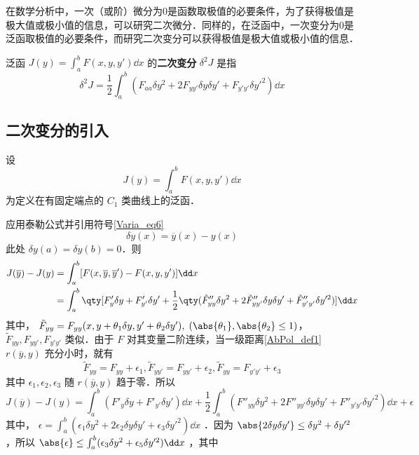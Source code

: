 
\begin{issues}
\issueTODO
\end{issues}

在数学分析中，一次（或阶）微分为0是函数取极值的必要条件，为了获得极值是极大值或极小值的信息，可以研究二次微分．同样的，在泛函中，一次变分为0是泛函取极值的必要条件，而研究二次变分可以获得极值是极大值或极小值的信息．

泛函 $J(y)=\int_a^bF(x,y,y')\dd x$ 的\textbf{二次变分} $\delta^2J$ 是指
\begin{equation}
\delta^2J=\frac{1}{2}\int_a^b(F_{aa}\delta y^2+2F_{yy'}\delta y\delta y'+F_{y'y'}\delta y'^2)\dd x
\end{equation}
\subsection{二次变分的引入}
设 
\begin{equation}
J(y)=\int_a^bF(x,y,y')\dd x
\end{equation}
为定义在有固定端点的 $C_1$ 类曲线上的泛函．

应用泰勒公式并引用符号\autoref{Varia_eq6}~
\begin{equation}
\delta y(x)=\overline{y}(x)-y(x)
\end{equation}
此处 $\delta y(a)=\delta y(b)=0$．则
\begin{equation}
\begin{aligned}
J(\overline{y})-J(y)&=\int_a^b[F(x,\overline{y},\overline{y}')-F(x,y,y')]\dd x\\
&=\int_a^b\qty[F'_y\delta y+F'_{y'}\delta y'+\frac{1}{2}\qty(\tilde{F}''_{yy}\delta y^2+2\tilde{F}''_{yy'}\delta y\delta y'+\tilde{F}''_{y'y'}\delta y'^2)]\dd x
\end{aligned}
\end{equation}
其中， $\tilde{F}_{yy}=F_{yy}(x,y+\theta_1\delta y,y'+\theta_2\delta y'),\;(\abs{\theta_1},\abs{\theta_2}\leq1)$，$\tilde{F}_{yy},F_{yy'},F_{y'y'}$ 类似．由于 $F$ 对其变量二阶连续，当一级距离\autoref{AbPol_def1}~ $r(\overline{y},y)$ 充分小时，就有
\begin{equation}
\tilde F_{yy}=F_{yy}+\epsilon_1,\tilde F_{yy'}=F_{yy'}+\epsilon_2,\tilde F_{yy}=F_{y'y'}+\epsilon_3
\end{equation}
其中 $\epsilon_1,\epsilon_2,\epsilon_3$ 随 $r(\overline{y},y)$ 趋于零．所以
\begin{equation}
J(\overline{y})-J(y)=\int_a^b(F'_y\delta y+F'_{y'}\delta y')\dd x+\frac{1}{2}\int_a^b(F''_{yy}\delta y^2+2F''_{yy'}\delta y\delta y'+F''_{y'y'}\delta y'^2)\dd x+\epsilon
\end{equation}
其中， $\epsilon=\int_a^b(\epsilon_1\delta y^2+2\epsilon_2\delta y\delta y'+\epsilon_3\delta y'^2)\dd x$
．因为 $\abs{2\delta y\delta y'}\leq \delta y^2+\delta y'^2$，所以 $\abs{\epsilon}\leq \int_a^b(\epsilon_3\delta y^2+\epsilon_5\delta y'^2)\dd x$ ，其中